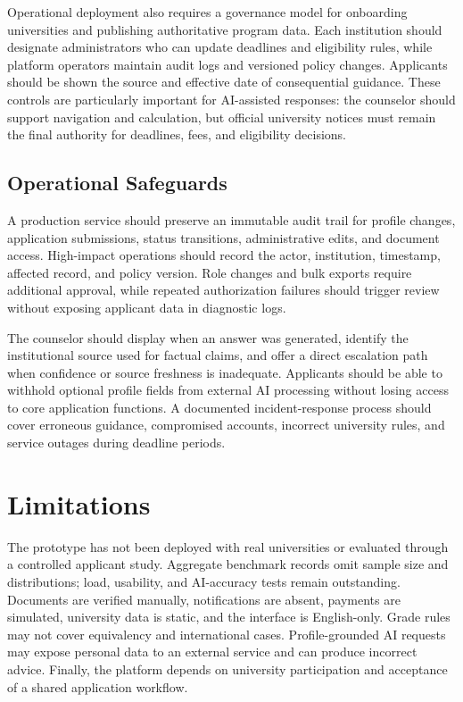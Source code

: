 \documentclass[conference,letterpaper]{IEEEtran}
\begin{document}
Operational deployment also requires a governance model for onboarding universities and publishing authoritative program data. Each institution should designate administrators who can update deadlines and eligibility rules, while platform operators maintain audit logs and versioned policy changes. Applicants should be shown the source and effective date of consequential guidance. These controls are particularly important for AI-assisted responses: the counselor should support navigation and calculation, but official university notices must remain the final authority for deadlines, fees, and eligibility decisions.

\subsection{Operational Safeguards}
A production service should preserve an immutable audit trail for profile changes, application submissions, status transitions, administrative edits, and document access. High-impact operations should record the actor, institution, timestamp, affected record, and policy version. Role changes and bulk exports require additional approval, while repeated authorization failures should trigger review without exposing applicant data in diagnostic logs.

The counselor should display when an answer was generated, identify the institutional source used for factual claims, and offer a direct escalation path when confidence or source freshness is inadequate. Applicants should be able to withhold optional profile fields from external AI processing without losing access to core application functions. A documented incident-response process should cover erroneous guidance, compromised accounts, incorrect university rules, and service outages during deadline periods.

\section{Limitations}
The prototype has not been deployed with real universities or evaluated through a controlled applicant study. Aggregate benchmark records omit sample size and distributions; load, usability, and AI-accuracy tests remain outstanding. Documents are verified manually, notifications are absent, payments are simulated, university data is static, and the interface is English-only. Grade rules may not cover equivalency and international cases. Profile-grounded AI requests may expose personal data to an external service and can produce incorrect advice. Finally, the platform depends on university participation and acceptance of a shared application workflow.
\end{document}
